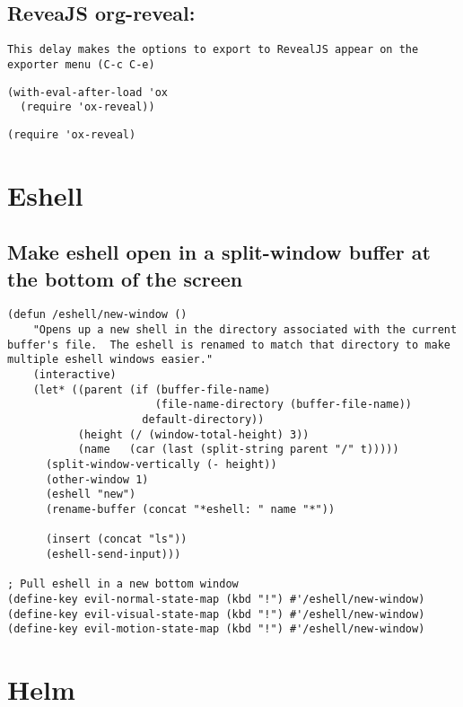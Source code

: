 \documentclass[11pt]{article}
\begin{document}
\subsection*{ReveaJS org-reveal:}
\label{sec:orgc09a28e}
\begin{verbatim}
This delay makes the options to export to RevealJS appear on the exporter menu (C-c C-e)
\end{verbatim}

\begin{verbatim}
(with-eval-after-load 'ox
  (require 'ox-reveal))
\end{verbatim}

\begin{verbatim}
(require 'ox-reveal)
\end{verbatim}



\section*{Eshell}
\label{sec:org6ff1514}

\subsection*{Make eshell open in a split-window buffer at the bottom of the screen}
\label{sec:org39da531}

\begin{verbatim}
(defun /eshell/new-window ()
    "Opens up a new shell in the directory associated with the current buffer's file.  The eshell is renamed to match that directory to make multiple eshell windows easier."
    (interactive)
    (let* ((parent (if (buffer-file-name)
                       (file-name-directory (buffer-file-name))
                     default-directory))
           (height (/ (window-total-height) 3))
           (name   (car (last (split-string parent "/" t)))))
      (split-window-vertically (- height))
      (other-window 1)
      (eshell "new")
      (rename-buffer (concat "*eshell: " name "*"))

      (insert (concat "ls"))
      (eshell-send-input)))

; Pull eshell in a new bottom window
(define-key evil-normal-state-map (kbd "!") #'/eshell/new-window)
(define-key evil-visual-state-map (kbd "!") #'/eshell/new-window)
(define-key evil-motion-state-map (kbd "!") #'/eshell/new-window)
\end{verbatim}


\section*{Helm}
\label{sec:org8e35df6}
\end{document}
